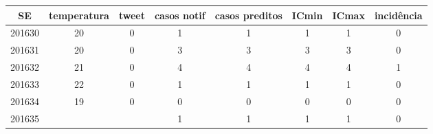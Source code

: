 \begin{tabular}{c|ccccccc}
  \hline
SE & temperatura & tweet & casos notif & casos preditos & ICmin & ICmax & incidência \\ 
  \hline
201630 & 20 & 0 & 1 & 1 & 1 & 1 & 0 \\ 
  201631 & 20 & 0 & 3 & 3 & 3 & 3 & 0 \\ 
  201632 & 21 & 0 & 4 & 4 & 4 & 4 & 1 \\ 
  201633 & 22 & 0 & 1 & 1 & 1 & 1 & 0 \\ 
  201634 & 19 & 0 & 0 & 0 & 0 & 0 & 0 \\ 
  201635 &  &  & 1 & 1 & 1 & 1 & 0 \\ 
   \hline
\end{tabular}
